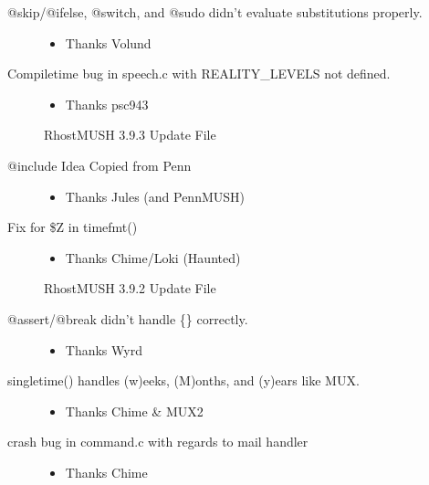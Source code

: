 \documentclass[letterpaper,10pt,english]{sphinxmanual}
\begin{document}
\begin{description}
\item[{@skip/@ifelse, @switch, and @sudo didn’t evaluate substitutions properly.}] \leavevmode\begin{itemize}
\item {} 
\sphinxAtStartPar
Thanks Volund

\end{itemize}

\item[{Compiletime bug in speech.c with REALITY\_LEVELS not defined.}] \leavevmode\begin{itemize}
\item {} 
\sphinxAtStartPar
Thanks psc943

\end{itemize}

\sphinxAtStartPar
RhostMUSH 3.9.3 Update File

\item[{@include \textendash{} Idea Copied from Penn}] \leavevmode\begin{itemize}
\item {} 
\sphinxAtStartPar
Thanks Jules (and PennMUSH)

\end{itemize}

\item[{Fix for \$Z in timefmt()}] \leavevmode\begin{itemize}
\item {} 
\sphinxAtStartPar
Thanks Chime/Loki (Haunted)

\end{itemize}

\sphinxAtStartPar
RhostMUSH 3.9.2 Update File

\item[{@assert/@break didn’t handle \{\} correctly.}] \leavevmode\begin{itemize}
\item {} 
\sphinxAtStartPar
Thanks Wyrd

\end{itemize}

\item[{singletime() handles (w)eeks, (M)onths, and (y)ears like MUX.}] \leavevmode\begin{itemize}
\item {} 
\sphinxAtStartPar
Thanks Chime \& MUX2

\end{itemize}

\item[{crash bug in command.c with regards to mail handler}] \leavevmode\begin{itemize}
\item {} 
\sphinxAtStartPar
Thanks Chime


\end{itemize}
\end{description}
\end{document}
